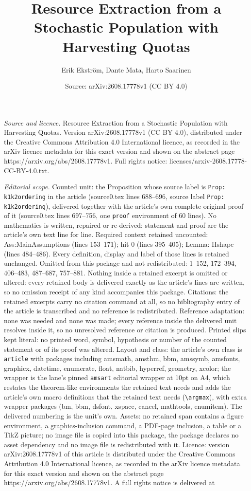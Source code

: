 \documentclass[10pt,a4paper]{amsart}
\title[Resource Extraction from a Stochastic Population with Harves]{Resource Extraction from a Stochastic Population with Harvesting Quotas}
\author{Erik Ekstr\"om, Dante Mata, Harto Saarinen}
\date{Source: arXiv:2608.17778v1 (CC BY 4.0)}
\begin{document}
\maketitle

\noindent\emph{Source and licence.} Resource Extraction from a Stochastic Population with Harvesting Quotas. Version arXiv:2608.17778v1 (CC BY 4.0), distributed under the Creative Commons Attribution 4.0 International licence, as recorded in the arXiv licence metadata for this exact version and shown on the abstract page https://arxiv.org/abs/2608.17778v1. Full rights notice: licenses/arxiv-2608.17778-CC-BY-4.0.txt.\par\smallskip

\noindent\textit{Editorial scope.} Counted unit: the Proposition whose source label is \texttt{Prop: k1k2ordering} in the article (source0.tex lines 688--696, source label \texttt{Prop: k1k2ordering}), delivered together with the article's own complete original proof of it (source0.tex lines 697--756, one \texttt{proof} environment of 60 lines). No mathematics is written, repaired or re-derived: statement and proof are the article's own text line for line. Required context retained uncounted: Ass:MainAssumptions (lines 153--171); hit 0 (lines 395--405); Lemma: Hshape (lines 484--486). Every definition, display and label of those lines is retained unchanged. Omitted from this package and not redistributed: 1--152, 172--394, 406--483, 487--687, 757--881. Nothing inside a retained excerpt is omitted or altered: every retained body is delivered exactly as the article's lines are written, so no omission receipt of any kind accompanies this package. Citations: the retained excerpts carry no citation command at all, so no bibliography entry of the article is transcribed and no reference is redistributed. Reference adaptation: none was needed and none was made; every reference inside the delivered unit resolves inside it, so no unresolved reference or citation is produced. Printed slips kept literal: no printed word, symbol, hypothesis or number of the counted statement or of its proof was altered. Layout and class: the article's own class is \texttt{article} with packages including amsmath, amsthm, bbm, amssymb, amsfonts, graphicx, datetime, enumerate, float, natbib, hyperref, geometry, xcolor; the wrapper is the lane's pinned \texttt{amsart} editorial wrapper at 10pt on A4, which restates the theorem-like environments the retained text needs and adds the article's own macro definitions that the retained text needs (\texttt{\textbackslash argmax}), with extra wrapper packages (bm, bbm, dsfont, xspace, cancel, mathtools, enumitem). The delivered numbering is the unit's own. Assets: no retained span contains a figure environment, a graphics-inclusion command, a PDF-page inclusion, a table or a TikZ picture; no image file is copied into this package, the package declares no asset dependency and no image file is redistributed with it. Licence: version arXiv:2608.17778v1 of this article is distributed under the Creative Commons Attribution 4.0 International licence, as recorded in the arXiv licence metadata for this exact version and shown on the abstract page https://arxiv.org/abs/2608.17778v1. A full rights notice is delivered at 
\end{document}
